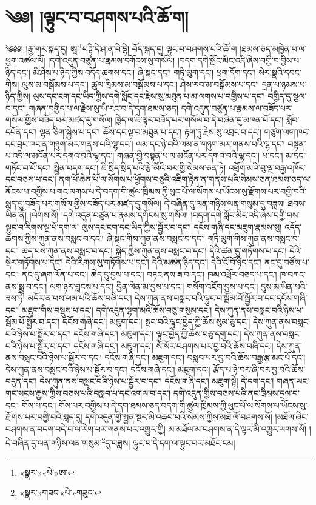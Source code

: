 \chapter{༄༅། །ལྟུང་བ་བཤགས་པའི་ཆོ་ག།}༄༅༅། །རྒྱ་གར་སྐད་དུ། ཨཱ་\footnote{«སྣར་»«པེ་»ཨ་}པཏྟི་དེ་ཤ་ན་བི་དྷི། བོད་སྐད་དུ། ལྟུང་བ་བཤགས་པའི་ཆོ་ག །ཐམས་ཅད་མཁྱེན་པ་ལ་ཕྱག་འཚལ་ལོ། །དགེ་འདུན་བཙུན་པ་རྣམས་དགོངས་སུ་གསོལ། །བདག་དགེ་སློང་མིང་འདི་ཞེས་བགྱི་བ་བྱིས་པ་ཉིད་དང་། མི་ཤེས་པ་ཉིད་ཀྱིས་འདོད་ཆགས་དང་། ཞེ་སྡང་དང་། གཏི་མུག་དང་། ཕྲག་དོག་དང་། སེར་སྣའི་དབང་གིས། ལུས་མ་བསྒོམས་པ་དང་། ཚུལ་ཁྲིམས་མ་བསྒོམས་པ་དང་། ཤེས་རབ་མ་བསྒོམས་པ་དང་། དྲན་པ་ཉམས་པ་ཉིད་ཀྱིས། ལུས་དང་ངག་དང་ཡིད་ཀྱིས་དགེ་སློང་དང་རྗེས་སུ་མཐུན་པ་མ་ལགས་པ་བགྱིས་པ་དང་། བགྱིད་དུ་སྩལ་བ་དང་། གཞན་བགྱིད་པ་ལ་རྗེས་སུ་ཡི་རང་བ་དེ་དག་ཐམས་ཅད། དགེ་འདུན་བཙུན་པ་རྣམས་ལ་བཟོད་པར་གསོལ་གྱིས་བཟོད་པར་མཛད་དུ་གསོལ། ཁྱེད་ལ་ཇི་ལྟར་བཟོད་པར་གསོལ་བ་དེ་བཞིན་དུ་མཁན་པོ་དང་། སློབ་དཔོན་དང་། ལྷན་ཅིག་སྐྱེས་པ་དང་། ཆོས་དང་ལྟ་བ་མཐུན་པ་དང་། རྟག་ཏུ་རྗེས་སུ་འབྲང་བ་དང་། གཙུག་ལག་ཁང་དང་བྲང་ཁང་ན་གཉུག་མར་གནས་པའི་ལྷ་དང་། ལམ་དང་ཉེ་བའི་ལམ་ན་གཉུག་མར་གནས་པའི་ལྷ་དང་། བསྟན་པ་འདི་ལ་མངོན་པར་དགའ་བའི་ལྷ་དང་། གཞན་གྱི་བསྟན་པ་ལ་མངོན་པར་དགའ་བའི་ལྷ་དང་། ཕ་དང་། མ་དང་། གཏོང་བ་པོ་དང་། སྦྱིན་བདག་དང་། ཇི་སྲིད་སྲིད་པའི་རྩེ་མོའི་བར་གྱི་སེམས་ཅན་ཏེ། འཕྲོག་མའི་བུ་ལྔ་བརྒྱ་འཁོར་དང་བཅས་པ་དང་། ནག་པོ་ཆེན་པོ་ལ་སོགས་པ་ཕྱོགས་བཅུའི་འཇིག་རྟེན་ན་གནས་པའི་སེམས་ཅན་ཐམས་ཅད་ལ་ནོངས་པ་བགྱིས་པ་གང་ལགས་པ་དེ་བདག་གི་ཚུལ་ཁྲིམས་ཀྱི་ཕུང་པོ་ལ་སོགས་པ་ཡོངས་སུ་རྫོགས་པར་བགྱི་བའི་སླད་དུ་བཟོད་པར་གསོལ་གྱིས་བཟོད་པར་མཛད་དུ་གསོལ། དེ་བཞིན་དུ་ལན་གཉིས་ལན་གསུམ་དུ་བཟླས། ཐབས་ཡིན་ནོ། །ལེགས་སོ། །དགེ་འདུན་བཙུན་པ་རྣམས་དགོངས་སུ་གསོལ། །བདག་དགེ་སློང་མིང་འདི་ཞེས་བགྱི་བས་ལྟུང་བ་རིགས་ལྔ་པོ་དག་ལ། ལུས་དང་ངག་དང་ཡིད་ཀྱིས་སྦྱོར་བ་དང་། དངོས་གཞི་དང་མཇུག་རྣམས་སུ། འདོད་ཆགས་ཀྱིས་ཀུན་ནས་བསླང་བ་དང་། ཞེ་སྡང་གིས་ཀུན་ནས་བསླང་བ་དང་། གཏི་མུག་གིས་ཀུན་ནས་བསླང་བ་དང་། ཆད་པས་ཀུན་ནས་བསླང་བ་དང་། སྐྱེད་ཀྱིས་ཀུན་ནས་བསླང་བ་དང་། དེའི་ཚན་དུ་གཏོགས་པ་དང་། དེའི་སྡེར་གཏོགས་པ་དང་། དེའི་རིགས་སུ་གཏོགས་པ་དང་། དེའི་མཚན་ཉིད་དང་། དེའི་ངོ་བོ་ཉིད་དང་། ནང་དུ་བཙོས་པ་དང་། ནང་དུ་ཞག་ལོན་པ་དང་། ཆེད་དུ་བྱས་པ་དང་། བཏང་ནས་ཟ་བ་དང་། ཁམ་འཕྲོར་བཅད་པ་དང་། ཁ་བཀང་ནས་སྨྲ་བ་དང་། ལག་ཉར་བླངས་པ་དང་། བྱིན་ལེན་མ་བྱས་པ་དང་། གསོག་འཇོག་བྱས་པ་དང་། དུས་མ་ཡིན་པའི་ཟས་ཏེ། མདོར་ན་ཕས་ཕམ་པའི་ཆོས་བཞི་དང་། དེས་ཀུན་ནས་བསླང་བའི་ལྟུང་བ་སྦོམ་པོ་སྦྱོར་བ་དང་དངོས་གཞི་དང་། མཇུག་གིས་བསྡུས་པ་དང་། དགེ་འདུན་ལྷག་མའི་ཆོས་བཅུ་གསུམ་དང་། དེས་ཀུན་ནས་བསླང་བའི་ཉེས་པ་སྦོམ་པོ་སྦྱོར་བ་དང་། དངོས་གཞི་དང་། མཇུག་དང་། སྤང་བའི་ལྟུང་བྱེད་ཀྱི་ཆོས་སུམ་ཅུ་དང་། དེས་ཀུན་ནས་བསླང་བའི་ཉེས་པ་སྦྱོར་བ་དང་། དངོས་གཞི་དང་། མཇུག་དང་། ལྟུང་བྱེད་ཀྱི་ཆོས་བཅུ་དགུ་དང་། དེས་ཀུན་ནས་བསླང་བའི་ཉེས་པ་སྦྱོར་བ་དང་། དངོས་གཞི་དང་། མཇུག་དང་། སོ་སོར་བཤགས་པར་བྱ་བའི་ཆོས་བཞི་དང་། དེས་ཀུན་ནས་བསླང་བའི་ཉེས་པ་སྦྱོར་བ་དང་། དངོས་གཞི་དང་། མཇུག་དང་། བསླབ་པར་བྱ་བའི་ཆོས་བརྒྱ་རྩ་མང་པོ་དང་། དེས་ཀུན་ནས་བསླང་བའི་ཉེས་པ་སྦྱོར་བ་དང་། དངོས་གཞི་དང་། མཇུག་དང་། རྩོད་པ་ཉེ་བར་ཞི་བར་བྱ་བའི་ཆོས་བདུན་དང་། དེས་ཀུན་ནས་བསླང་བའི་ཉེས་པ་སྦྱོར་བ་དང་། དངོས་གཞི་དང་། མཇུག་སྟེ། དེ་དག་དང་། གཞན་ཡང་གང་སངས་རྒྱས་ཀྱིས་བཅས་པའི་བསླབ་པ་དང་འགལ་བ་དང་། དགེ་འདུན་གྱིས་བཅས་པའི་ནང་ཁྲིམས་དྲལ་བ་དང་། གོས་པ་དང་། གོས་པར་བགྱིས་པ་དེ་དག་ཐམས་ཅད་བདག་གི་ཚུལ་ཁྲིམས་ཀྱི་ཕུང་པོ་ལ་སོགས་པ་ཡོངས་སུ་རྫོགས་པར་བགྱི་བའི་སླད་དུ། དགེ་འདུན་གྱི་སྤྱན་སྔར་མི་འཆབ་པའི་སེམས་ཀྱིས་མཐོ་ལོ་བཤགས་སོ། །མཐོལ་ཞིང་བཤགས་ན་བདག་བདེ་བ་ལ་རེག་པར་གནས་པར་འགྱུར་གྱི། མ་མཐོལ་མ་བཤགས་ན་དེ་ལྟར་མི་འགྱུར་ལགས་སོ། །དེ་བཞིན་དུ་ལན་གཉིས་ལན་གསུམ་\footnote{«སྣར་»གཟང་«པེ་»གཟུང་}དུ་བཟླས། ལྟུང་བ་དེ་དག་ལ་ལྟུང་བར་མཐོང་ངམ། 